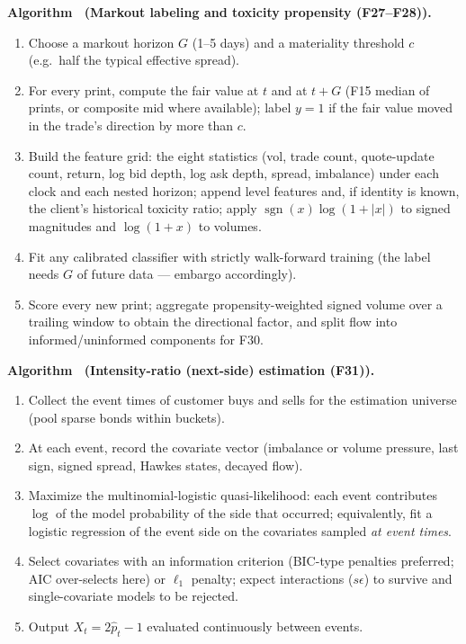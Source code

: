 \documentclass[11pt]{article}
\newcommand{\sgn}{\operatorname{sgn}}
\newcounter{algo}
\newenvironment{algo}[1]{%
  \refstepcounter{algo}%
  \par\medskip\noindent\textbf{Algorithm \thealgo\ (#1).}%
  \begin{enumerate}[label=\arabic*.,leftmargin=2em,itemsep=1pt,topsep=3pt]}%
  {\end{enumerate}\medskip}
\newcounter{fac}
\begin{document}
\begin{algo}{Markout labeling and toxicity propensity (F27--F28)}
\item Choose a markout horizon $G$ (1--5 days) and a materiality threshold $c$ (e.g.\ half the typical effective spread).
\item For every print, compute the fair value at $t$ and at $t+G$ (F15 median of prints, or composite mid where available); label $y=1$ if the fair value moved in the trade's direction by more than $c$.
\item Build the feature grid: the eight statistics (vol, trade count, quote-update count, return, log bid depth, log ask depth, spread, imbalance) under each clock and each nested horizon; append level features and, if identity is known, the client's historical toxicity ratio; apply $\sgn(x)\log(1+|x|)$ to signed magnitudes and $\log(1+x)$ to volumes.
\item Fit any calibrated classifier with strictly walk-forward training (the label needs $G$ of future data --- embargo accordingly).
\item Score every new print; aggregate propensity-weighted signed volume over a trailing window to obtain the directional factor, and split flow into informed/uninformed components for F30.
\end{algo}

\begin{algo}{Intensity-ratio (next-side) estimation (F31)}\label{alg:ratio}
\item Collect the event times of customer buys and sells for the estimation universe (pool sparse bonds within buckets).
\item At each event, record the covariate vector (imbalance or volume pressure, last sign, signed spread, Hawkes states, decayed flow).
\item Maximize the multinomial-logistic quasi-likelihood: each event contributes $\log$ of the model probability of the side that occurred; equivalently, fit a logistic regression of the event side on the covariates sampled \emph{at event times}.
\item Select covariates with an information criterion (BIC-type penalties preferred; AIC over-selects here) or $\ell_1$ penalty; expect interactions ($s\epsilon$) to survive and single-covariate models to be rejected.
\item Output $X_t = 2\hat p_t - 1$ evaluated continuously between events.
\end{algo}
\end{document}
